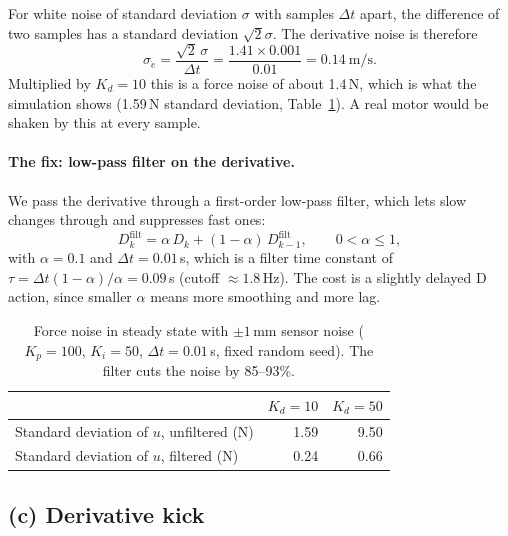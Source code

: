 \documentclass[]{article}
\begin{document}
For white noise of standard deviation $\sigma$ with samples $\Delta t$ apart, the difference of two samples has a standard deviation $\sqrt{2}\sigma$. The derivative noise is therefore
\begin{equation}
	\sigma_{\dot e} = \frac{\sqrt{2}\,\sigma}{\Delta t}
	= \frac{1.41 \times 0.001}{0.01} = 0.14\ \text{m/s}.
\end{equation}
Multiplied by $K_d = 10$ this is a force noise of about 1.4\,N, which is what the simulation shows (1.59\,N standard deviation, Table~\ref{tab:noise}). A real motor would be shaken by this at every sample.

\paragraph{The fix: low-pass filter on the derivative.}
We pass the derivative through a first-order low-pass filter, which lets slow changes through and suppresses fast ones:
\begin{equation}
	D_k^{\text{filt}} = \alpha\, D_k + (1-\alpha)\, D_{k-1}^{\text{filt}}, \qquad 0 < \alpha \le 1 ,
\end{equation}
with $\alpha = 0.1$ and $\Delta t = 0.01$\,s, which is a filter time constant of $\tau = \Delta t(1-\alpha)/\alpha = 0.09$\,s (cutoff $\approx 1.8$\,Hz). The cost is a slightly delayed D action, since smaller $\alpha$ means more smoothing and more lag.

\begin{table}[h]
	\centering
	\begin{tabular}{@{}lrr@{}}
		\toprule
		& $K_d = 10$ & $K_d = 50$ \\
		\midrule
		Standard deviation of $u$, unfiltered (N) & 1.59 & 9.50 \\
		Standard deviation of $u$, filtered (N)   & 0.24 & 0.66 \\
		\bottomrule
	\end{tabular}
	\caption{Force noise in steady state with $\pm1$\,mm sensor noise ($K_p=100$, $K_i=50$, $\Delta t=0.01$\,s, fixed random seed). The filter cuts the noise by 85--93\%.}
	\label{tab:noise}
\end{table}


\subsection{(c) Derivative kick}
\end{document}
